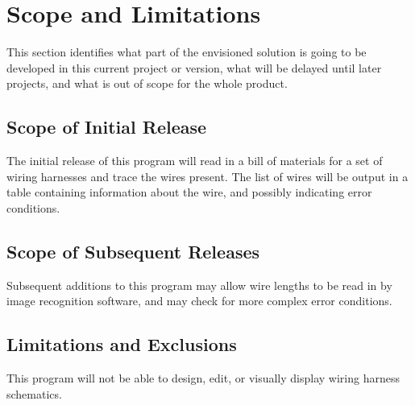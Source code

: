 \section{Scope and Limitations}
This section identifies what part of the envisioned solution is going to be
developed in this current project or version, what will be delayed until
later projects, and what is out of scope for the whole product.  

\subsection{Scope of Initial Release}
The initial release of this program will read in a bill of materials for a set of wiring harnesses and trace the wires present.
The list of wires will be output in a table containing information about the wire, and possibly indicating error conditions.

\subsection{Scope of Subsequent Releases}
Subsequent additions to this program may allow wire lengths to be read in by image recognition software, and may check
for more complex error conditions.

\subsection{Limitations and Exclusions}
This program will not be able to design, edit, or visually display wiring harness schematics.
